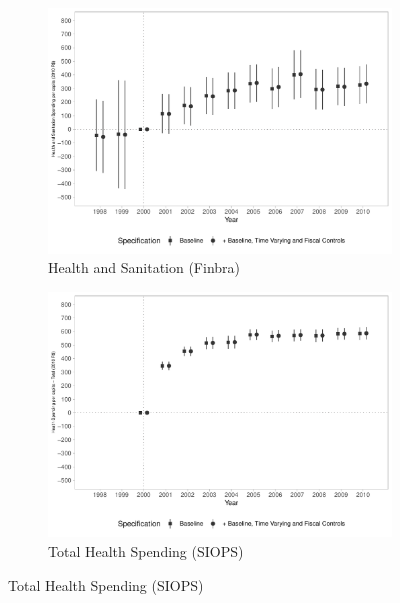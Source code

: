 \begin{figure}[h!]
    \begin{center}
    \caption{Effects on Public Health Spending per capita}\label{fig:9}
    \begin{subfigure}{0.48\textwidth}
        \caption{\scriptsize Health and Sanitation (Finbra)}\label{fig:9a}
        \centering
\includegraphics[width=\textwidth]{plots/finbra_desp_saude_san_pcapita_dist_ec29_baseline_dist_ec29_baseline_9.pdf}
    \end{subfigure}
    \begin{subfigure}{0.48\textwidth}
        \centering
        \caption{\scriptsize Total Health Spending (SIOPS)}\label{fig:9b}
        \includegraphics[width=\textwidth]{plots/siops_despsaude_pcapita_dist_ec29_baseline_dist_ec29_baseline_9.pdf}

\end{subfigure}
\end{center}
\end{figure}
